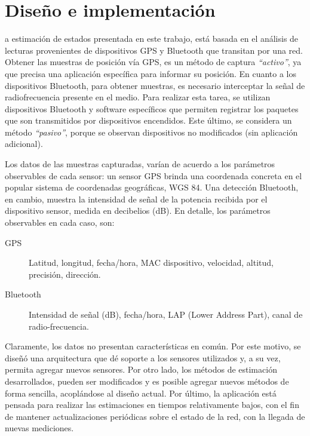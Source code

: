 \let\textcircled=\pgftextcircled
\chapter {Diseño e implementación}
\label{chap:implementacion}

a estimación de estados presentada en este trabajo, está basada en el análisis de lecturas provenientes de dispositivos GPS y Bluetooth que transitan por una red. Obtener las muestras de posición vía GPS, es un método de captura \textit{``activo''}, ya que precisa una aplicación específica para informar su posición. En cuanto a los dispositivos Bluetooth, para obtener muestras, es necesario interceptar la señal de radiofrecuencia presente en el medio. Para realizar esta tarea, se utilizan dispositivos Bluetooth y software específicos que permiten registrar los paquetes que son transmitidos por dispositivos encendidos. Este último, se considera un método \textit{``pasivo''}, porque se observan dispositivos no modificados (sin aplicación adicional). 

Los datos de las muestras capturadas, varían de acuerdo a los parámetros observables de cada sensor: un sensor GPS brinda una coordenada concreta en el popular sistema de coordenadas geográficas, WGS 84. Una detección Bluetooth, en cambio, muestra la intensidad de señal de la potencia recibida por el dispositivo sensor, medida en decibelios (dB). En detalle, los parámetros observables en cada caso, son:

\begin{description}
    \item [GPS] Latitud, longitud, fecha/hora, MAC dispositivo, velocidad, altitud, precisión, dirección.
    \item [Bluetooth] Intensidad de señal (dB), fecha/hora, LAP (Lower Address Part), canal de radio-frecuencia.
\end{description}

Claramente, los datos no presentan características en común. Por este motivo, se diseñó una arquitectura que dé soporte a los sensores utilizados y, a su vez, permita agregar nuevos sensores. Por otro lado, los métodos de estimación desarrollados, pueden ser modificados y es posible agregar nuevos métodos de forma sencilla, acoplándose al diseño actual. Por último, la aplicación está pensada para realizar las estimaciones en tiempos relativamente bajos, con el fin de mantener actualizaciones periódicas sobre el estado de la red, con la llegada de nuevas mediciones.

